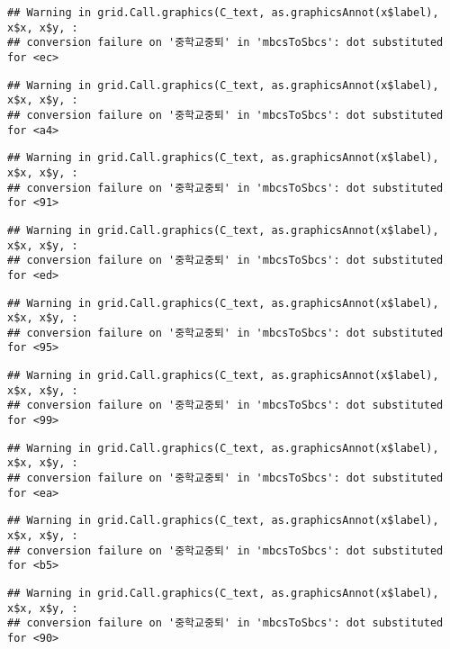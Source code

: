 \documentclass[
]{article}
\begin{document}
\begin{verbatim}
## Warning in grid.Call.graphics(C_text, as.graphicsAnnot(x$label), x$x, x$y, :
## conversion failure on '중학교중퇴' in 'mbcsToSbcs': dot substituted for <ec>
\end{verbatim}

\begin{verbatim}
## Warning in grid.Call.graphics(C_text, as.graphicsAnnot(x$label), x$x, x$y, :
## conversion failure on '중학교중퇴' in 'mbcsToSbcs': dot substituted for <a4>
\end{verbatim}

\begin{verbatim}
## Warning in grid.Call.graphics(C_text, as.graphicsAnnot(x$label), x$x, x$y, :
## conversion failure on '중학교중퇴' in 'mbcsToSbcs': dot substituted for <91>
\end{verbatim}

\begin{verbatim}
## Warning in grid.Call.graphics(C_text, as.graphicsAnnot(x$label), x$x, x$y, :
## conversion failure on '중학교중퇴' in 'mbcsToSbcs': dot substituted for <ed>
\end{verbatim}

\begin{verbatim}
## Warning in grid.Call.graphics(C_text, as.graphicsAnnot(x$label), x$x, x$y, :
## conversion failure on '중학교중퇴' in 'mbcsToSbcs': dot substituted for <95>
\end{verbatim}

\begin{verbatim}
## Warning in grid.Call.graphics(C_text, as.graphicsAnnot(x$label), x$x, x$y, :
## conversion failure on '중학교중퇴' in 'mbcsToSbcs': dot substituted for <99>
\end{verbatim}

\begin{verbatim}
## Warning in grid.Call.graphics(C_text, as.graphicsAnnot(x$label), x$x, x$y, :
## conversion failure on '중학교중퇴' in 'mbcsToSbcs': dot substituted for <ea>
\end{verbatim}

\begin{verbatim}
## Warning in grid.Call.graphics(C_text, as.graphicsAnnot(x$label), x$x, x$y, :
## conversion failure on '중학교중퇴' in 'mbcsToSbcs': dot substituted for <b5>
\end{verbatim}

\begin{verbatim}
## Warning in grid.Call.graphics(C_text, as.graphicsAnnot(x$label), x$x, x$y, :
## conversion failure on '중학교중퇴' in 'mbcsToSbcs': dot substituted for <90>
\end{verbatim}
\end{document}
